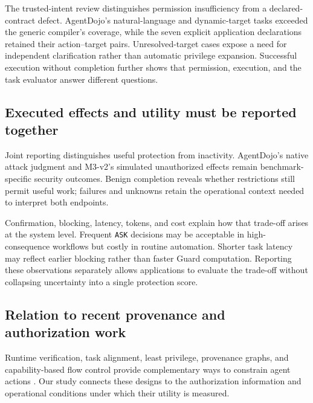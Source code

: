 The trusted-intent review distinguishes permission insufficiency from a declared-contract defect. AgentDojo's natural-language and dynamic-target tasks exceeded the generic compiler's coverage, while the seven explicit application declarations retained their action--target pairs. Unresolved-target cases expose a need for independent clarification rather than automatic privilege expansion. Successful execution without completion further shows that permission, execution, and the task evaluator answer different questions.

\subsection{Executed effects and utility must be reported together}

\label{sec:discussion-executed-effects-and-utility-must-be-reported-together}

Joint reporting distinguishes useful protection from inactivity. AgentDojo's native attack judgment and M3-v2's simulated un\-au\-thor\-ized effects remain benchmark-specific security outcomes. Benign completion reveals whether restrictions still permit useful work; failures and unknowns retain the operational context needed to interpret both endpoints.

Confirmation, blocking, latency, tokens, and cost explain how that trade-off arises at the system level. Frequent \nolinkurl{ASK} decisions may be acceptable in high-consequence workflows but costly in routine automation. Shorter task latency may reflect earlier blocking rather than faster Guard computation. Reporting these observations separately allows applications to evaluate the trade-off without collapsing uncertainty into a single protection score.

\subsection{Relation to recent provenance and authorization work}

\label{sec:discussion-relation-to-recent-provenance-and-authorization-work}

Runtime verification, task alignment, least privilege, provenance graphs, and capability-based flow control provide complementary ways to constrain agent actions \citep{L01,L02,L03,L21,L22,L24,L25,L26,L35,L36}. Our study connects these designs to the authorization information and operational conditions under which their utility is measured.

